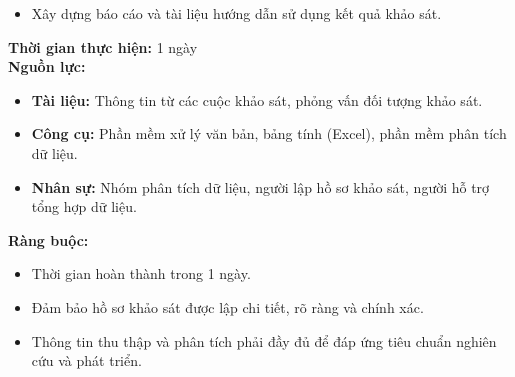 {\begin{minipage}{\textwidth}
\begin{itemize}
\begin{itemize}
            \item Mục tiêu khảo sát.
            \item Đối tượng khảo sát.
            \item Phương pháp khảo sát.
            \item Kết quả khảo sát.
            \item Phân tích và kết luận.
        \end{itemize}
        \item Xây dựng báo cáo và tài liệu hướng dẫn sử dụng kết quả khảo sát.
    \end{itemize}
    \vspace{0.5cm}
    \noindent \textbf{Thời gian thực hiện:} 1 ngày \\
    \noindent \textbf{Nguồn lực:}
    \begin{itemize}
        \item \textbf{Tài liệu:} Thông tin từ các cuộc khảo sát, phỏng vấn đối tượng khảo sát.
        \item \textbf{Công cụ:} Phần mềm xử lý văn bản, bảng tính (Excel), phần mềm phân tích dữ liệu.
        \item \textbf{Nhân sự:} Nhóm phân tích dữ liệu, người lập hồ sơ khảo sát, người hỗ trợ tổng hợp dữ liệu.
    \end{itemize}
    \vspace{0.5cm}
    \noindent \textbf{Ràng buộc:}
    \begin{itemize}
        \item Thời gian hoàn thành trong 1 ngày.
        \item Đảm bảo hồ sơ khảo sát được lập chi tiết, rõ ràng và chính xác.
        \item Thông tin thu thập và phân tích phải đầy đủ để đáp ứng tiêu chuẩn nghiên cứu và phát triển.
    \end{itemize}
    \end{minipage}
}

\newpage %

